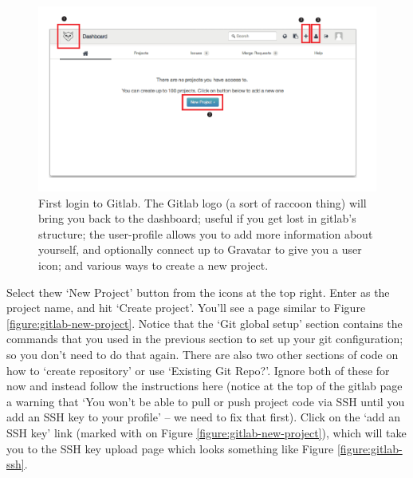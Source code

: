 \begin{figure}
\centerline{\includegraphics[width=15cm]{images/gitlab-first-login}}
\caption{First login to Gitlab. \protect{} The Gitlab logo (a sort of raccoon thing) will bring you back to the dashboard; useful if you get lost in gitlab's structure; \protect{} the user-profile allows you to add more information about yourself, and optionally connect up to Gravatar to give you a user icon; and \protect{} various ways to create a new project.}\label{figure:gitlab-first-login}
\end{figure}

Select thew `New Project' button from the icons at the top right. Enter  as the project name, and hit `Create project'. You'll see a page similar to Figure \ref{figure:gitlab-new-project}. Notice that the `Git global setup' section contains the commands that you used in the previous section to set up your git configuration; so you don't need to do that again. There are also two other sections of code on how to `create repository' or use `Existing Git Repo?'. Ignore both of these for now and instead follow the instructions here (notice at the top of the gitlab page a warning that `You won't be able to pull or push project code via SSH until you add an SSH key to your profile' -- we need to fix that first). Click on the `add an SSH key' link (marked with \protect{} on Figure \ref{figure:gitlab-new-project}), which will take you to the SSH key upload page which looks something like Figure \ref{figure:gitlab-ssh}.

